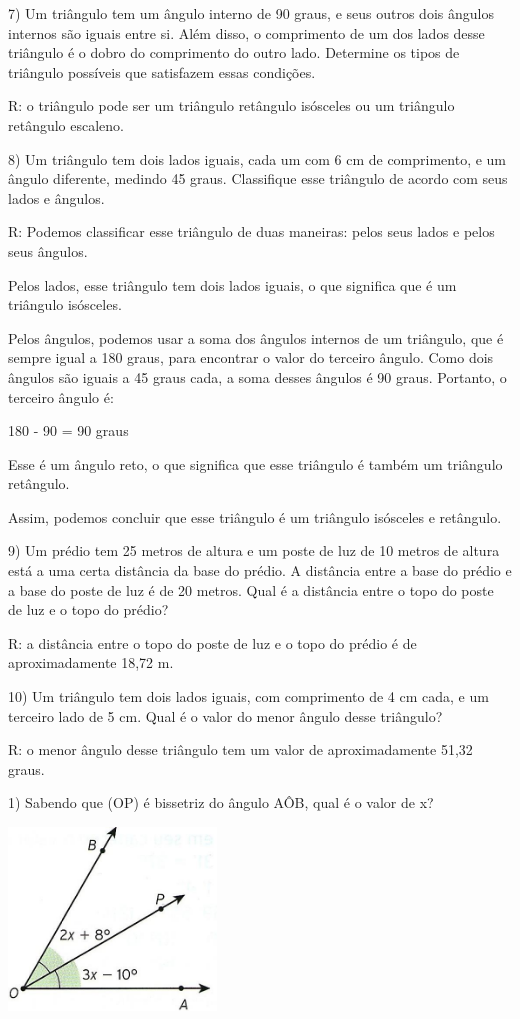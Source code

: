 7) Um triângulo tem um ângulo interno de 90 graus, e seus outros dois
ângulos internos são iguais entre si. Além disso, o comprimento de um
dos lados desse triângulo é o dobro do comprimento do outro lado.
Determine os tipos de triângulo possíveis que satisfazem essas
condições.

R: o triângulo pode ser um triângulo retângulo isósceles ou um triângulo
retângulo escaleno.

8) Um triângulo tem dois lados iguais, cada um com 6 cm de comprimento,
e um ângulo diferente, medindo 45 graus. Classifique esse triângulo de
acordo com seus lados e ângulos.

R: Podemos classificar esse triângulo de duas maneiras: pelos seus lados
e pelos seus ângulos.

Pelos lados, esse triângulo tem dois lados iguais, o que significa que é
um triângulo isósceles.

Pelos ângulos, podemos usar a soma dos ângulos internos de um triângulo,
que é sempre igual a 180 graus, para encontrar o valor do terceiro
ângulo. Como dois ângulos são iguais a 45 graus cada, a soma desses
ângulos é 90 graus. Portanto, o terceiro ângulo é:

180 - 90 = 90 graus

Esse é um ângulo reto, o que significa que esse triângulo é também um
triângulo retângulo.

Assim, podemos concluir que esse triângulo é um triângulo isósceles e
retângulo.

9) Um prédio tem 25 metros de altura e um poste de luz de 10 metros de
altura está a uma certa distância da base do prédio. A distância entre a
base do prédio e a base do poste de luz é de 20 metros. Qual é a
distância entre o topo do poste de luz e o topo do prédio?

R: a distância entre o topo do poste de luz e o topo do prédio é de
aproximadamente 18,72 m.

10) Um triângulo tem dois lados iguais, com comprimento de 4 cm cada, e
um terceiro lado de 5 cm. Qual é o valor do menor ângulo desse
triângulo?

R: o menor ângulo desse triângulo tem um valor de aproximadamente 51,32
graus.


1) Sabendo que (OP) é bissetriz do ângulo AÔB, qual é o valor de x?

\includegraphics[width=2.17708in,height=1.91619in]{./imgSAEB_6_MAT/media/image62.jpeg}

